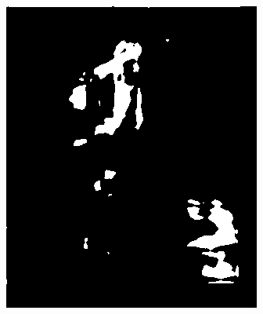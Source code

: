 \begin{figure}[h]
\begin{subfigure}[b]{0.18\textwidth}
     \end{subfigure}
    \hfill
     \begin{subfigure}[b]{0.18\textwidth}
         \centering
         \includegraphics[width=\textwidth]{images/results/base_st/ivan1_skinny_2.png}
     \end{subfigure}
    \hfill
     \begin{subfigure}[b]{0.18\textwidth}
         \centering

\end{subfigure}
\end{figure}
